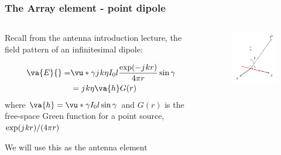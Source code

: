 \documentclass[10pt]{beamer}
\renewcommand{\j}{{j}\mkern1mu} %
\begin{document}
\begin{frame}
    \frametitle{The Array element - point dipole}
    \begin{columns}[T] %
        \begin{column}{.4\textwidth}
            \begin{outline}
                \1 Recall from the antenna introduction lecture, the field pattern of an infinitesimal dipole:
            \end{outline}
            \begin{align*}
                \va{E} {}=& \vu*{\gamma} \j k \eta I_0 l \frac{\exp(-\j k r)}{4 \pi r} \sin \gamma \nonumber \\
                &= \j k \eta \va{h} G(r)
            \end{align*}
            where $\va{h} = \vu*{\gamma} I_0 l \sin \gamma$ and $G(r)$ is the free-space Green function for a point source, $\exp(\j k r)/(4 \pi r)$
            \begin{outline}
                \1 We will use this as the antenna element
            \end{outline}
        \end{column}
        \begin{column}{.4\textwidth}
            \begin{figure}[B!]
                \centering
                \includegraphics[width=.75\textwidth]{line_source.pdf}
            \end{figure}

\end{column}
\end{columns}
\end{frame}
\end{document}
